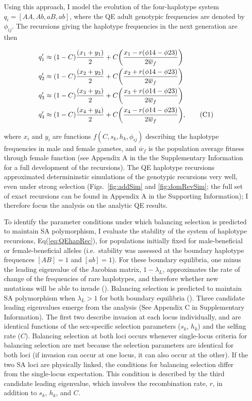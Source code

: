 \documentclass{article}
\newcommand\numberthis{\addtocounter{equation}{1}\tag{\theequation}}
\begin{document}
Using this approach, I model the evolution of the four-haplotype system $q_i = [AA, Ab, aB, ab]$, where the QE adult genotypic frequencies are denoted by $\phi_{ij}$. The recursions giving the haplotype frequencies in the next generation are then

\begin{align*} \label{eq:QEhapRec}
	q'_1 &\approx (1 - C) \frac{(x_1 + y_1)}{2} + C \bigg( \frac{x_1 - r(\phi{14} - \phi{23})}{2 \overline{w}_f} \bigg) \\
	q'_2 &\approx (1 - C) \frac{(x_2 + y_2)}{2} + C \bigg( \frac{x_2 + r(\phi{14} - \phi{23})}{2 \overline{w}_f} \bigg) \\
	q'_3 &\approx (1 - C) \frac{(x_3 + y_3)}{2} + C \bigg( \frac{x_3 + r(\phi{14} - \phi{23})}{2 \overline{w}_f} \bigg) \\
	q'_4 &\approx (1 - C) \frac{(x_4 + y_4)}{2} + C \bigg( \frac{x_4 - r(\phi{14} - \phi{23})}{2 \overline{w}_f} \bigg), \numberthis
\end{align*}

\noindent{} where $x_i$ and $y_i$ are functions $f(C, s_k, h_k, \phi_{ij})$ describing the haplotype frequencies in male and female gametes, and $\overline{w}_f$ is the population average fitness through female function (see Appendix A in the the Supplementary Information for a full development of the recursions). The QE haplotype recursions approximated determininstic simulations of the genotypic recursions very well, even under strong selection (Figs.~\ref{fig:addSim} and \ref{fig:domRevSim}; the full set of exact recursions can be found in Appendix A in the Supporting Information); I therefore focus the analysis on the analytic QE results. 

To identify the parameter conditions under which balancing selection is predicted to maintain SA polymorphism, I evaluate the stability of the system of haplotype recursions, Eq(\ref{eq:QEhapRec}), for populations initially fixed for male-beneficial or female-beneficial alleles (i.e.~stability was assessed at the boundary haplotype frequences $[AB]=1$ and $[ab]=1$). For these boundary equilibria, one minus the leading eigenvalue of the Jacobian matrix, $1 - \lambda_L$, approximates the rate of change of the frequencies of rare haplotypes, and therefore whether new mutations will be able to invade (\citealt{OttoDay2007}). Balancing selection is predicted to maintain SA polymorphism when $\lambda_L > 1$ for both boundary equilibria (\citealt{Prout1968}). Three candidate leading eigenvalues emerge from the analysis (See Appendix C in Supplementary Information). The first two describe invasion at each locus individually, and are identical functions of the sex-specific selection parameters ($s_k$, $h_k$) and the selfing rate ($C$). Balancing selection at both loci occurs whenever single-locus criteria for balancing selection are met because the selection parameters are identical for both loci (if invasion can occur at one locus, it can also occur at the other). If the two SA loci are physically linked, the conditions for balancing selection differ from the single-locus expectation. This condition is described by the third candidate leading eigenvalue, which involves the recombination rate, $r$, in addition to $s_k$, $h_k$, and $C$.
\end{document}
